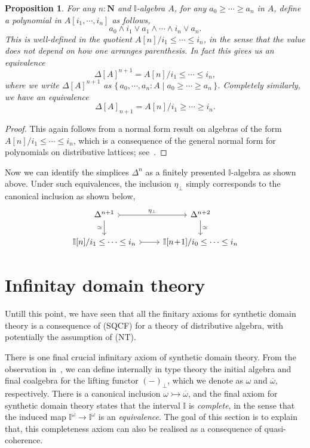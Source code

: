 \documentclass[12pt]{amsart}
\newtheorem{proposition}[theorem]{Proposition}
\theoremstyle{definition}
\newcommand{\mb}[1]{\mathbf{#1}}
\newcommand{\mbb}[1]{\mathbb{#1}}
\newcommand{\I}{\mbb I}
\newcommand{\ov}[1]{\overline{#1}}
\newcommand{\scomp}[2]{\{\,#1\mid#2\,\}}
\newcommand{\inj}{\rightarrowtail}
\newcommand{\N}{\mb N}
\newcommand{\prt}{_{\bot}}
\begin{document}
\begin{proposition}\label{prop:simplicesasalgebra}
  For any $n : \N$ and $\I$-algebra $A$, for any $a_0 \ge \cdots \ge a_n$ in $A$, define a polynomial in $A[i_1,\cdots,i_n]$ as follows,
  \[ a_0 \wedge i_1 \vee a_1 \wedge \cdots \wedge i_n \vee a_n. \]
  This is well-defined in the quotient $A[n]/i_1 \le \cdots \le i_n$, in the sense that the value does not depend on how one arranges parenthesis. In fact this gives us an equivalence
  \[ \Delta[A]^{n+1} = A[n]/i_1 \le \cdots \le i_n, \]
  where we write $\Delta[A]^{n+1}$ as $\scomp{a_0,\cdots,a_n : A}{a_0 \ge \cdots \ge a_n}$. Completely similarly, we have an equivalence
  \[ \Delta[A]_{n+1} = A[n]/i_1 \ge \cdots \ge i_n. \]
\end{proposition}
\begin{proof}
  This again follows from a normal form result on algebras of the form $A[n]/i_1 \le \cdots \le i_n$, which is a consequence of the general normal form for polynomials on distributive lattices; see~\cite[Thm. 10.21]{lausch2000algebra}.
\end{proof}

Now we can identify the simplices $\Delta^n$ as a finitely presented $\I$-algebra as shown above. Under such equivalences, the inclusion $\eta\prt$ simply corresponds to the canonical inclusion as shown below,
\[
  \begin{tikzcd}
    \Delta^{n+1} \ar[r, tail, "\eta\prt"] \ar[d, "\simeq"'] & \Delta^{n+2}  \ar[d, "\simeq"] \\ 
    \I[n]/i_1 \le \cdots \le i_n \ar[r, tail] & \I[n\!+\!1]/i_0 \le \cdots \le i_{n} 
  \end{tikzcd}
\]

\section{Infinitay domain theory}\label{sec:infdomain}

Untill this point, we have seen that all the finitary axioms for synthetic domain theory is a consequence of (SQCF) for a theory of distributive algebra, with potentially the assumption of (NT).

There is one final crucial infinitary axiom of synthetic domain theory. From the observation in~\cite{hyland2006first,JIBLADZE1997185}, we can define internally in type theory the initial algebra and final coalgebra for the lifting functor $(-)\prt$, which we denote as $\omega$ and $\ov\omega$, respectively. There is a canonical inclusion $\omega \inj \ov\omega$, and the final axiom for synthetic domain theory states that the interval $\I$ is \emph{complete}, in the sense that the induced map $\I^{\ov\omega} \to \I^\omega$ is an \emph{equivalence}. The goal of this section is to explain that, this completeness axiom can also be realised as a consequence of quasi-coherence.
\end{document}
